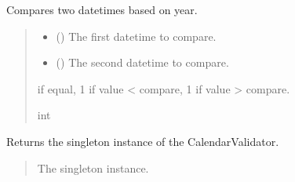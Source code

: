 \documentclass[letterpaper,10pt,english]{sphinxmanual}
\begin{document}
\begin{fulllineitems}
\begin{fulllineitems}
\label{\detokenize{apache_commons_validator_python.routines:apache_commons_validator_python.routines.calendar_validator.CalendarValidator.compare_years}}
\pysigstartsignatures
{}
\pysigstopsignatures
\sphinxAtStartPar
Compares two datetimes based on year.
\begin{quote}\begin{description}
\begin{itemize}
\item {} 
\sphinxAtStartPar
{} () \textendash{} The first datetime to compare.

\item {} 
\sphinxAtStartPar
{} () \textendash{} The second datetime to compare.

\end{itemize}

 if equal, \sphinxhyphen{}1 if value \textless{} compare, 1 if value \textgreater{} compare.

\sphinxAtStartPar
int

\end{description}\end{quote}

\end{fulllineitems}


\begin{fulllineitems}
\label{\detokenize{apache_commons_validator_python.routines:apache_commons_validator_python.routines.calendar_validator.CalendarValidator.get_instance}}
\pysigstartsignatures
{}
\pysigstopsignatures
\sphinxAtStartPar
Returns the singleton instance of the CalendarValidator.
\begin{quote}\begin{description}
\sphinxAtStartPar
The singleton instance.


\end{description}
\end{quote}
\end{fulllineitems}
\end{fulllineitems}
\end{document}
